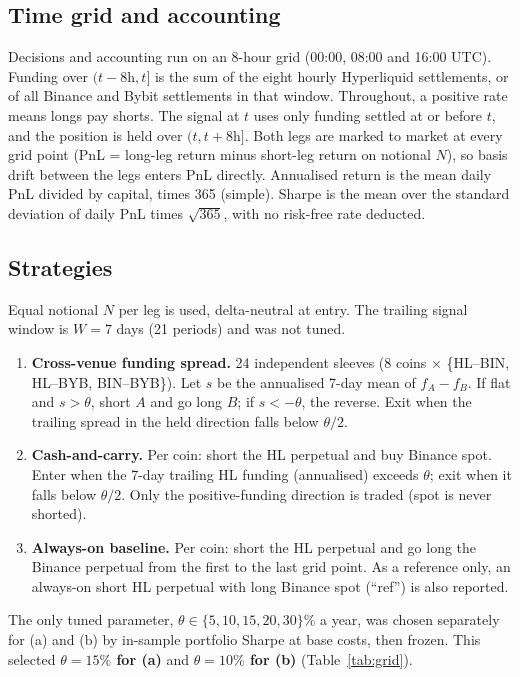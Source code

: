 \documentclass[11pt,a4paper]{article}
\begin{document}
\subsection{Time grid and accounting}
Decisions and accounting run on an 8-hour grid (00:00, 08:00 and 16:00 UTC).
Funding over $(t-8\text{h}, t]$ is the sum of the eight hourly Hyperliquid settlements, or of all Binance and Bybit settlements in that window.
Throughout, a positive rate means longs pay shorts.
The signal at $t$ uses only funding settled at or before $t$, and the position is held over $(t, t+8\text{h}]$.
Both legs are marked to market at every grid point (PnL = long-leg return minus short-leg return on notional $N$), so basis drift between the legs enters PnL directly.
Annualised return is the mean daily PnL divided by capital, times 365 (simple). Sharpe is the mean over the standard deviation of daily PnL times $\sqrt{365}$, with no risk-free rate deducted.

\subsection{Strategies}
\label{sec:strategies}
Equal notional $N$ per leg is used, delta-neutral at entry. The trailing signal window is $W=7$ days (21 periods) and was not tuned.
\begin{enumerate}[label=(\alph*)]
\item \textbf{Cross-venue funding spread.} 24 independent sleeves (8 coins $\times$ \{HL--BIN, HL--BYB, BIN--BYB\}). Let $s$ be the annualised 7-day mean of $f_A-f_B$. If flat and $s>\theta$, short $A$ and go long $B$; if $s<-\theta$, the reverse. Exit when the trailing spread in the held direction falls below $\theta/2$.
\item \textbf{Cash-and-carry.} Per coin: short the HL perpetual and buy Binance spot. Enter when the 7-day trailing HL funding (annualised) exceeds $\theta$; exit when it falls below $\theta/2$. Only the positive-funding direction is traded (spot is never shorted).
\item \textbf{Always-on baseline.} Per coin: short the HL perpetual and go long the Binance perpetual from the first to the last grid point. As a reference only, an always-on short HL perpetual with long Binance spot (``ref'') is also reported.
\end{enumerate}
The only tuned parameter, $\theta \in \{5, 10, 15, 20, 30\}\%$ a year, was chosen separately for (a) and (b) by in-sample portfolio Sharpe at base costs, then frozen. This selected \textbf{$\theta=15\%$ for (a)} and \textbf{$\theta=10\%$ for (b)} (Table~\ref{tab:grid}).
\end{document}
